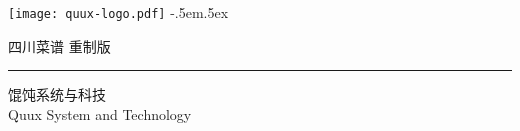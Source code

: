 
\begingroup%
\texttt{[image: quux-logo.pdf]}%
{\sffamily\tiny\kern-.5em\lower.5ex\hbox{\texttrademark}}%
\endgroup%

\vfill

\begin{flushright}
\singlespacing
\footnotesize%
\hefamily%
四川菜谱\,{}\,重制版%
	\mbox{\hspace{.87814pt}}%

\vspace{-.3125\baselineskip}%
\rule{73.11665pt}{1pt}%
\vspace{.1875\baselineskip}%

馄饨系统与科技%
	\mbox{\hspace{10.20990pt}}\\%
{\sffamily\tiny Quux System and Technology}%
\end{flushright}

